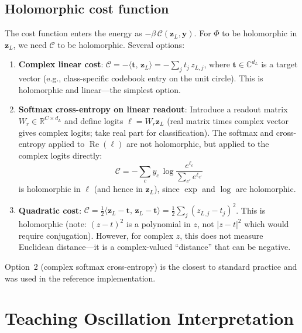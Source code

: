 \documentclass[11pt]{article}
\newcommand{\R}{\mathbb{R}}
\newcommand{\C}{\mathbb{C}}
\theoremstyle{definition}
\DeclareMathOperator{\Real}{Re}
\begin{document}
\subsection{Holomorphic cost function}\label{sec:cost}

The cost function enters the energy as $-\beta\,\mathcal{C}(\bm{z}_L,\bm{y})$.
For $\Phi$ to be holomorphic in $\bm{z}_L$, we need $\mathcal{C}$ to
be holomorphic.  Several options:

\begin{enumerate}
\item \textbf{Complex linear cost}:
  $\mathcal{C} = -\langle\bm{t},\,\bm{z}_L\rangle
  = -\sum_j t_j\,z_{L,j}$,
  where $\bm{t}\in\C^{d_L}$ is a target vector (e.g., class-specific
  codebook entry on the unit circle).
  This is holomorphic and linear---the simplest option.

\item \textbf{Softmax cross-entropy on linear readout}:
  Introduce a readout matrix $W_r\in\R^{C\times d_L}$ and define
  logits $\bm{\ell}=W_r\bm{z}_L$ (real matrix times complex vector
  gives complex logits; take real part for classification).
  The softmax and cross-entropy applied to $\Real(\bm{\ell})$ are not
  holomorphic, but applied to the complex logits directly:
  \[
    \mathcal{C} = -\sum_c y_c\,\log\frac{e^{\ell_c}}{\sum_{c'}e^{\ell_{c'}}}
  \]
  is holomorphic in $\bm{\ell}$ (and hence in $\bm{z}_L$), since
  $\exp$ and $\log$ are holomorphic.

\item \textbf{Quadratic cost}:
  $\mathcal{C} = \tfrac{1}{2}\langle\bm{z}_L-\bm{t},\,
  \bm{z}_L-\bm{t}\rangle
  = \tfrac{1}{2}\sum_j(z_{L,j}-t_j)^2$.
  This is holomorphic (note: $(z-t)^2$ is a polynomial in $z$, not
  $|z-t|^2$ which would require conjugation).  However, for complex $z$,
  this does not measure Euclidean distance---it is a complex-valued
  ``distance'' that can be negative.
\end{enumerate}

Option~2 (complex softmax cross-entropy) is the closest to standard
practice and was used in the reference implementation.

\section{Teaching Oscillation Interpretation}\label{sec:osc}
\end{document}

